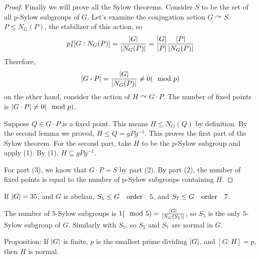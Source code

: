 \documentclass[a4paper,twoside,master.tex]{subfiles}
\begin{document}
\begin{proof}
    Finally we will prove all the Sylow theorems. Consider $ S $ to be the set of all p-Sylow subgroups of $ G $. Let's examine the conjugation action $ G\curvearrowright S $. $ P \leq N_G(P) $, the stabilizer of this action, so
    \begin{equation}
        p \slashed{\mid} [G:N_G(P)] = \frac{\abs{G}}{\abs{N_G(P)}} = \frac{\abs{G}}{\abs{P}} \frac{\abs{P}}{\abs{N_G(P)}}
    \end{equation}
    Therefore,
    \begin{equation}
        \abs{G \vdot P} = \frac{\abs{G}}{\abs{N_G(P)}} \neq 0 (\mod p)
    \end{equation}
    on the other hand, consider the action of $ H\curvearrowright G \cdot P $. The number of fixed points is $ \abs{G \cdot P} \neq 0 (\mod p) $.

    Suppose $ Q \in G \cdot P $ is a fixed point. This means $ H \leq N_G(Q) $ by definition. By the second lemma we proved, $ H \leq Q = gPg^{-1} $. This proves the first part of the Sylow theorem. For the second part, take $ H $ to be the p-Sylow subgroup and apply (1). By (1), $ H \subseteq gPg^{-1} $.

    For part (3), we know that $ G \cdot P = S $ by part (2). By part (2), the number of fixed points is equal to the number of p-Sylow subgroups containing $ H $.
\end{proof}

\begin{ex}
    If $ \abs{G} = 35 $, and $ G $ is abelian, $ S_5 \leq G \qq{order} 5$, and $ S_7 \leq G \qq{order} 7 $.

    The number of $ 5 $-Sylow subgroups is $ 1(\mod 5) = \frac{\abs{G}}{\abs{N_G(S_5)}} $, so $ S_5 $ is the only $ 5 $-Sylow subgroup of $ G $. Similarly with $ S_7 $, so $ S_5 $ and $ S_7 $ are normal in $ G $.
\end{ex}

Proposition: If $ \abs{G} $ is finite, $ p $ is the smallest prime dividing $ \abs{G} $, and $ [G:H] = p $, then $ H $ is normal.
\end{document}

